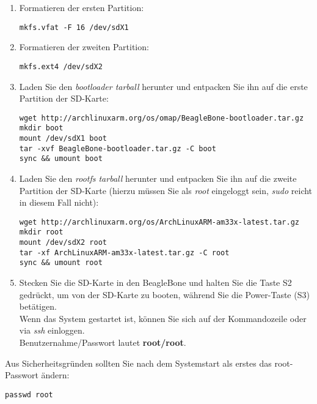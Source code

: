 \begin{enumerate}
\item Formatieren der ersten Partition:

\begin{lstlisting}
mkfs.vfat -F 16 /dev/sdX1
\end{lstlisting}

\item Formatieren der zweiten Partition:

\begin{lstlisting}
mkfs.ext4 /dev/sdX2
\end{lstlisting}

\item Laden Sie den \textit{bootloader tarball} herunter und entpacken Sie ihn auf die erste Partition der SD-Karte:

\begin{lstlisting}
wget http://archlinuxarm.org/os/omap/BeagleBone-bootloader.tar.gz
mkdir boot
mount /dev/sdX1 boot
tar -xvf BeagleBone-bootloader.tar.gz -C boot
sync && umount boot
\end{lstlisting}

\item Laden Sie den \textit{rootfs tarball} herunter und entpacken Sie ihn auf die zweite Partition der SD-Karte (hierzu müssen Sie als \textit{root} eingeloggt sein, \emph{sudo} reicht in diesem Fall nicht):

\begin{lstlisting}
wget http://archlinuxarm.org/os/ArchLinuxARM-am33x-latest.tar.gz
mkdir root
mount /dev/sdX2 root
tar -xf ArchLinuxARM-am33x-latest.tar.gz -C root
sync && umount root
\end{lstlisting}

\item Stecken Sie die SD-Karte in den BeagleBone und halten Sie die Taste S2 gedrückt, um von der SD-Karte zu booten, während Sie die Power-Taste (S3) betätigen.\\
Wenn das System gestartet ist, können Sie sich auf der Kommandozeile oder via \emph{ssh} einloggen.\\

Benutzernahme/Passwort lautet \textbf{root/root}.

\end{enumerate}

Aus Sicherheitsgründen sollten Sie nach dem Systemstart als erstes das root-Passwort ändern:

\begin{lstlisting}
passwd root
\end{lstlisting}

